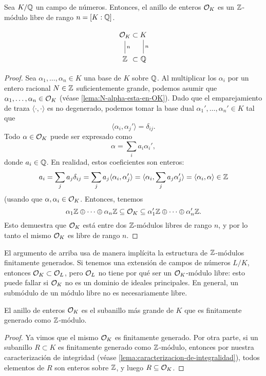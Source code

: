 \begin{teorema}
  Sea $K/\mathbb{Q}$ un campo de números. Entonces, el anillo de enteros $\mathcal{O}_K$
  es un $\mathbb{Z}$-módulo libre de rango $n = [K : \mathbb{Q}]$.

  \[ \begin{tikzcd}
    \O_K \ar[-]{d}{n} &[-3em] \subset &[-3em] K \ar[-]{d}{n} \\
    \ZZ & \subset & \QQ
  \end{tikzcd} \]

  \begin{proof}
    Sea $\alpha_1,\ldots,\alpha_n \in K$ una base de $K$ sobre $\mathbb{Q}$.
    Al multiplicar los $\alpha_i$ por un entero racional $N \in \mathbb{Z}$
    suficientemente grande, podemos asumir que
    $\alpha_1,\ldots,\alpha_n \in \mathcal{O}_K$ (véase \ref{lema:N-alpha-esta-en-OK}).
    Dado que el emparejamiento de traza $\langle\cdot,\cdot\rangle$
    es no degenerado, podemos tomar la base dual
    $\alpha_1',\ldots,\alpha_n' \in K$ tal que
    $$\langle \alpha_i, \alpha_j'\rangle = \delta_{ij}.$$
    Todo $\alpha \in \mathcal{O}_K$ puede ser expresado como
    $$\alpha = \sum_i a_i \alpha_i',$$
    donde $a_i \in \mathbb{Q}$. En realidad, estos coeficientes son enteros:
    \[ a_i = \sum_j a_j \delta_{ij} =
       \sum_j a_j \langle\alpha_i, \alpha_j'\rangle =
       \langle\alpha_i, \sum_j a_j \alpha_j'\rangle =
       \langle\alpha_i, \alpha\rangle \in \mathbb{Z} \]
    (usando que $\alpha,\alpha_i \in \mathcal{O}_K$. Entonces, tenemos
    \[ \alpha_1 \mathbb{Z} \oplus \cdots \oplus \alpha_n \mathbb{Z} \subseteq \mathcal{O}_K \subseteq
       \alpha_1' \mathbb{Z} \oplus \cdots \oplus \alpha_n' \mathbb{Z}. \]
    Esto demuestra que $\mathcal{O}_K$ está entre dos $\mathbb{Z}$-módulos libres de rango $n$,
    y por lo tanto el mismo $\mathcal{O}_K$ es libre de rango $n$.
  \end{proof}
\end{teorema}

\begin{comentario}
  El argumento de arriba usa de manera implícita la estructura de $\mathbb{Z}$-módulos
  finitamente generados. Si tenemos una extensión de campos de números $L/K$,
  entonces $\mathcal{O}_K \subset \mathcal{O}_L$, pero $\mathcal{O}_L$ no tiene por qué ser un
  $\mathcal{O}_K$-módulo libre: esto puede fallar si $\mathcal{O}_K$ no es un dominio de ideales
  principales. En general, un submódulo de un módulo libre no es necesariamente
  libre.
\end{comentario}

\begin{corolario}
  El anillo de enteros $\mathcal{O}_K$ es el subanillo más grande de $K$ que es
  finitamente generado como $\mathbb{Z}$-módulo.

  \begin{proof}
    Ya vimos que el mismo $\mathcal{O}_K$ es finitamente generado. Por otra parte, si
    un subanillo $R \subset K$ es finitamente generado como $\mathbb{Z}$-módulo,
    entonces por nuestra caracterización de integridad
    (véase \ref{lema:caracterizacion-de-integralidad}), todos elementos de $R$
    son enteros sobre $\mathbb{Z}$, y luego $R \subseteq \mathcal{O}_K$.
  \end{proof}
\end{corolario}

